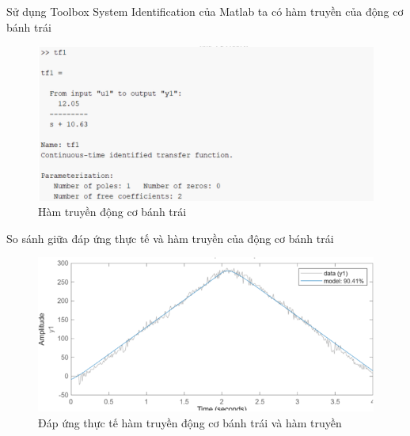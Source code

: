                \hspace*{0.6cm}Sử dụng Toolbox System Identification của Matlab ta có hàm truyền của động cơ bánh trái 
               \begin{figure}[H]
                    \centering
                    \includegraphics[width=1\textwidth]{pictures/chapter5/CJGB2_tf.png}
                    \caption{Hàm truyền động cơ bánh trái}
                    \label{CJGB2_tf}
               \end{figure} 
               \hspace*{0.6cm}So sánh giữa đáp ứng thực tế và hàm truyền của động cơ bánh trái
               \begin{figure}[H]
                    \centering
                    \includegraphics[width=1\textwidth]{pictures/chapter5/CJGB2_compare.png}
                    \caption{Đáp ứng thực tế hàm truyền động cơ bánh trái và hàm truyền}
                    \label{CJGB2_compare}
               \end{figure}
     




          


